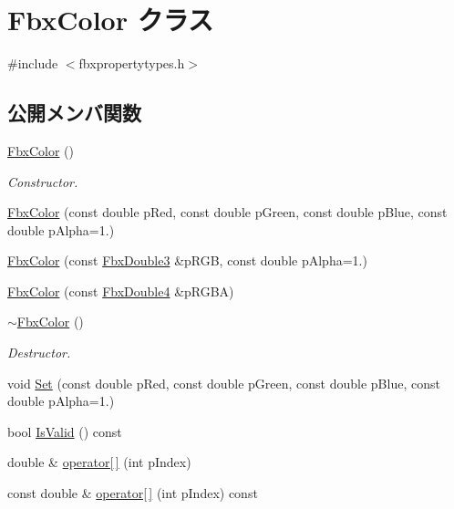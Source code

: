 \hypertarget{class_fbx_color}{}\section{Fbx\+Color クラス}
\label{class_fbx_color}


{\ttfamily \#include $<$fbxpropertytypes.\+h$>$}

\subsection*{公開メンバ関数}
\begin{DoxyCompactItemize}
\item 
\hyperlink{class_fbx_color_af9c8230979d074e82faead61fd92a3fc}{Fbx\+Color} ()
\begin{DoxyCompactList}\small\item\em Constructor. \end{DoxyCompactList}\item 
\hyperlink{class_fbx_color_a794e4dfc39f7f6ce2a2d884f21a6dac6}{Fbx\+Color} (const double p\+Red, const double p\+Green, const double p\+Blue, const double p\+Alpha=1.)
\item 
\hyperlink{class_fbx_color_a09f5704390406cd3da4fd7bd8b5ae32d}{Fbx\+Color} (const \hyperlink{fbxtypes_8h_ae0a96f14cde566774c7553aa7523b7a7}{Fbx\+Double3} \&p\+R\+GB, const double p\+Alpha=1.)
\item 
\hyperlink{class_fbx_color_a845eb670fb29e7a942973c4281c4939e}{Fbx\+Color} (const \hyperlink{fbxtypes_8h_a03dddc7979e0016f74a095b1943d97a3}{Fbx\+Double4} \&p\+R\+G\+BA)
\item 
\hyperlink{class_fbx_color_a5b8800e1233bdc6eb44add9be6cab9df}{$\sim$\+Fbx\+Color} ()
\begin{DoxyCompactList}\small\item\em Destructor. \end{DoxyCompactList}\item 
void \hyperlink{class_fbx_color_ae2e74f4aa5e142426e1453400bfb7520}{Set} (const double p\+Red, const double p\+Green, const double p\+Blue, const double p\+Alpha=1.)
\item 
bool \hyperlink{class_fbx_color_a12d5438931a4401d632612dc3564c433}{Is\+Valid} () const
\item 
double \& \hyperlink{class_fbx_color_ac396e40fa972caa64f29e94605660324}{operator\mbox{[}$\,$\mbox{]}} (int p\+Index)
\item 
const double \& \hyperlink{class_fbx_color_a578f043b19c6303d74c19d41daf2a254}{operator\mbox{[}$\,$\mbox{]}} (int p\+Index) const
\end{DoxyCompactItemize}
